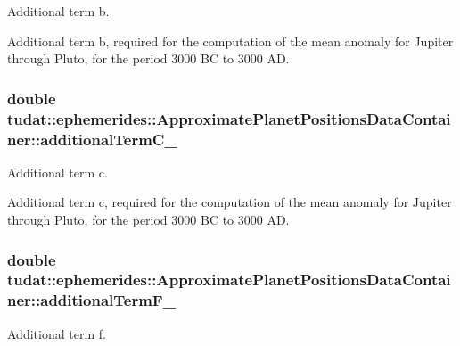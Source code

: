 Additional term b. 

Additional term b, required for the computation of the mean anomaly for Jupiter through Pluto, for the period 3000 BC to 3000 AD. 
\subsubsection[{\texorpdfstring{additional\+Term\+C\+\_\+}{additionalTermC_}}]{\setlength{\rightskip}{0pt plus 5cm}double tudat\+::ephemerides\+::\+Approximate\+Planet\+Positions\+Data\+Container\+::additional\+Term\+C\+\_\+}\hypertarget{structtudat_1_1ephemerides_1_1ApproximatePlanetPositionsDataContainer_a5b45c04ec7348046da355253127bf936}{}\label{structtudat_1_1ephemerides_1_1ApproximatePlanetPositionsDataContainer_a5b45c04ec7348046da355253127bf936}


Additional term c. 

Additional term c, required for the computation of the mean anomaly for Jupiter through Pluto, for the period 3000 BC to 3000 AD. 
\subsubsection[{\texorpdfstring{additional\+Term\+F\+\_\+}{additionalTermF_}}]{\setlength{\rightskip}{0pt plus 5cm}double tudat\+::ephemerides\+::\+Approximate\+Planet\+Positions\+Data\+Container\+::additional\+Term\+F\+\_\+}\hypertarget{structtudat_1_1ephemerides_1_1ApproximatePlanetPositionsDataContainer_a66a6e79e153d59f4d2ef1e6e6e7bbd36}{}\label{structtudat_1_1ephemerides_1_1ApproximatePlanetPositionsDataContainer_a66a6e79e153d59f4d2ef1e6e6e7bbd36}


Additional term f. 

